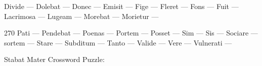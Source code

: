 \documentclass[12pt]{article}
\begin{document}
\pagestyle{fancy}
\fancyhf{}
\renewcommand{\headrulewidth}{0pt}
\renewcommand{\footrulewidth}{0pt}
\libertine
\renewcommand\PuzzleClueFont{\rm\normalsize}
\noindent\begin{rotate}{0}
\small Divide --- Dolebat --- Donec --- Emisit --- Fige --- Fleret --- Fons --- Fuit --- Lacrimosa --- Lugeam --- Morebat --- Morietur ---
\end{rotate}
\hfill
\begin{rotate}{270}
\small Pati --- Pendebat --- Poenas --- Portem --- Posset --- Sim --- Sis --- Sociare --- sortem --- Stare --- Subditum --- Tanto --- Valide --- Vere --- Vulnerati --- 
\end{rotate}
\begin{center}
  \huge{Stabat Mater Crossword Puzzle:}
\end{center}
\vspace{1.5cm}
\end{document}
